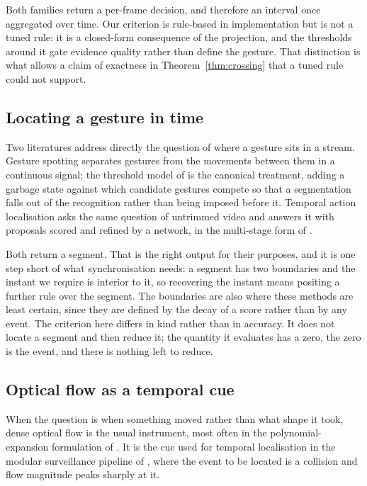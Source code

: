 \documentclass{article}
\theoremstyle{definition}
\begin{document}
Both families return a per-frame decision, and therefore an interval once
aggregated over time. Our criterion is rule-based in implementation but is not a
tuned rule: it is a closed-form consequence of the projection, and the
thresholds around it gate evidence quality rather than define the gesture. That
distinction is what allows a claim of exactness in
Theorem~\ref{thm:crossing} that a tuned rule could not support.

\subsection{Locating a gesture in time}

Two literatures address directly the question of where a gesture sits in a
stream. Gesture spotting separates gestures from the movements between them in a
continuous signal; the threshold model of \citet{lee1999threshold} is the
canonical treatment, adding a garbage state against which candidate gestures
compete so that a segmentation falls out of the recognition rather than being
imposed before it. Temporal action localisation asks the same question of
untrimmed video and answers it with proposals scored and refined by a network, in
the multi-stage form of \citet{shou2016temporal}.

Both return a segment. That is the right output for their purposes, and it is one
step short of what synchronisation needs: a segment has two boundaries and the
instant we require is interior to it, so recovering the instant means positing a
further rule over the segment. The boundaries are also where these methods are
least certain, since they are defined by the decay of a score rather than by any
event. The criterion here differs in kind rather than in accuracy. It does not
locate a segment and then reduce it; the quantity it evaluates has a zero, the
zero is the event, and there is nothing left to reduce.

\subsection{Optical flow as a temporal cue}

When the question is when something moved rather than what shape it took, dense
optical flow is the usual instrument, most often in the polynomial-expansion
formulation of \citet{farneback2003motion}. It is the cue used for temporal
localisation in the modular surveillance pipeline of
\citet{thakur2026accident}, where the event to be located is a collision and
flow magnitude peaks sharply at it.
\end{document}
